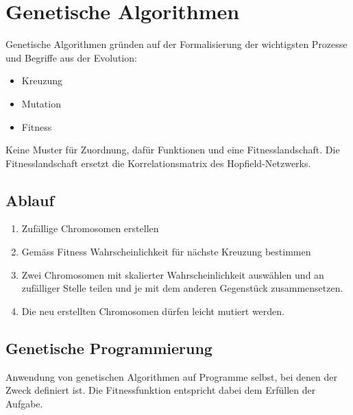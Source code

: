 \section{Genetische Algorithmen}
Genetische Algorithmen gründen auf der Formalisierung der wichtigsten
Prozesse und Begriffe aus der Evolution:
\begin{itemize}
	\item Kreuzung
	\item Mutation
	\item Fitness
\end{itemize}
Keine Muster für Zuordnung, dafür Funktionen und eine Fitnesslandschaft.
Die Fitnesslandschaft ersetzt die Korrelationsmatrix des
Hopfield-Netzwerks.
\subsection{Ablauf}
\begin{enumerate}
	\item Zufällige Chromosomen erstellen
	\item Gemäss Fitness Wahrscheinlichkeit für nächste Kreuzung bestimmen
	\item Zwei Chromosomen mit skalierter Wahrscheinlichkeit auswählen
		und an zufälliger Stelle teilen und je mit dem anderen
		Gegenstück zusammensetzen.
	\item Die neu erstellten Chromosomen dürfen leicht mutiert werden.
\end{enumerate}
\subsection{Genetische Programmierung}
Anwendung von genetischen Algorithmen auf Programme selbst, bei denen
der Zweck definiert ist. Die Fitnessfunktion entspricht dabei dem
Erfüllen der Aufgabe.

